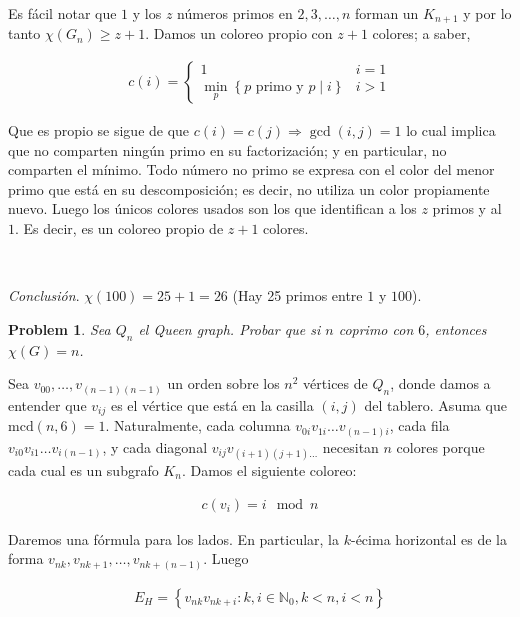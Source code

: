 \documentclass[a4paper, 12pt]{article}
\newtheorem{problem}{Problem}
\newtheorem{problem}{Problem}
\begin{document}
Es fácil notar que $1$ y los $z$ números primos en $2, 3, \ldots, n$ forman un
$K_{n+1}$ y por lo tanto $\chi(G_{n}) \geq z + 1$. Damos un coloreo propio con $z +
1$ colores; a saber,


\begin{align*}
    c(i) = \begin{cases}
        1 & i = 1 \\ 
        \min_{p} \left\{ p \text{ primo  y } p \mid i  \right\}  & i > 1
    \end{cases}
\end{align*}

Que es propio se sigue de que $c(i) = c(j) \Rightarrow \gcd(i, j) = 1$ lo cual
implica que no comparten ningún primo en su factorización; y en particular, no
comparten el mínimo. Todo número no primo se expresa con el color del menor
primo que está en su descomposición; es decir, no utiliza un color propiamente
nuevo. Luego los únicos colores usados son los que identifican a los $z$ primos
y al $1$. Es decir, es un coloreo propio de $z + 1$ colores. 

~ 

\textit{Conclusión}. $\chi(100) = 25 + 1 = 26$ (Hay 25 primos entre $1$ y
$100$).

\pagebreak

\begin{problem}
    Sea $Q_n$ el Queen graph. Probar que si $n$ coprimo con $6$, entonces
    $\chi(G) = n$.
\end{problem}

Sea $v_{00}, \ldots, v_{(n-1)(n-1)}$ un orden sobre los $n^2$ vértices de $Q_n$,
donde damos a entender que $v_{ij}$ es el vértice que está en la casilla $(i,
j)$ del tablero. Asuma que $\text{mcd}(n, 6) = 1$. Naturalmente, cada columna
$v_{0i}v_{1i}\ldots v_{(n-1)i}$, cada fila $v_{i 0}v_{i 1}\ldots v_{i (n - 1)}$,
y cada diagonal $v_{ij}v_{(i+1)(j+1) \ldots}$ necesitan $n$ colores porque
cada cual es un subgrafo $K_n$. Damos el siguiente coloreo: 

\begin{align*}
    c(v_i) = i \mod n
\end{align*}




Daremos una
fórmula para los lados. En particular, la $k$-écima horizontal es de la forma
$v_{nk}, v_{nk+1}, \ldots, v_{nk + (n -1)}$. Luego

\begin{align*}
    E_{H} = \left\{ v_{nk} v_{nk + i} : k, i \in  \mathbb{N}_0, k < n, i < n \right\}  
\end{align*}
\end{document}
